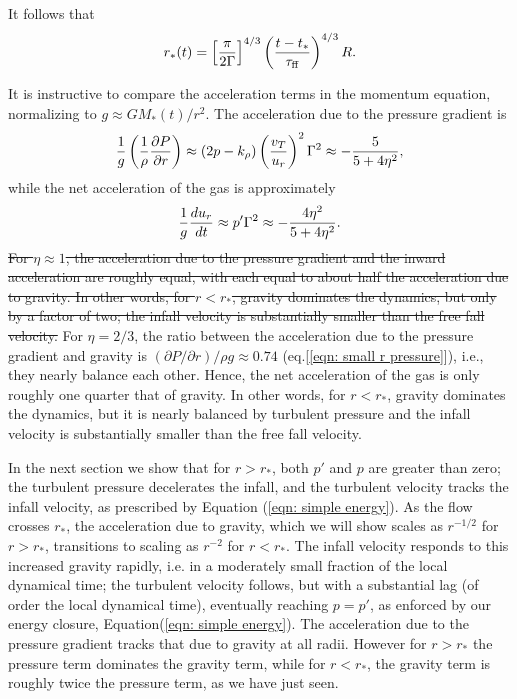 \documentclass[iop,apj,numberedappendix]{emulateapj}
\newcommand       \phil[1]      {{\color{blue} #1}}
\newcommand       \be		{\begin{equation}}
\newcommand       \ee		{\end{equation}}
\newcommand       \etaeff       {\eta}
\newcommand       \tff          {\tau_{\rm ff}}
\begin{document}
It follows that
%
\be \label{eqn: r_star}%
r_*(t)=\left[{\pi\over2\Gamma}\right]^{4/3}
\left({t-t_*\over\tff}\right)^{4/3}R.
\ee %
%

It is instructive to compare the acceleration terms in the momentum
equation, normalizing to $g\approx G M_*(t)/r^2$.  The acceleration
due to the pressure gradient is
%
\be  \label{eqn: small r pressure}%
{1\over g}\left({1\over\rho}{\partial P\over \partial r}\right)
\approx(2p-k_\rho)\left({v_T\over u_r}\right)^2\Gamma^2
\approx-{5\over 5+4\etaeff^2},
\ee  %
%
while the net acceleration of the gas is approximately
%
\be  %
{1\over g}{du_r\over dt}\approx p'\Gamma^2\approx-{4\etaeff^2\over 5+4\etaeff^2}.
\ee  %
%
\phil{\sout{
For $\etaeff\approx1$, the acceleration due to the pressure gradient
and the inward acceleration are roughly equal, with each equal to
about half the acceleration due to gravity. In other words, for
$r<r_*$, gravity dominates the dynamics, but only by a factor of two;
the infall velocity is substantially smaller than the free fall
velocity.
}
For $\etaeff = 2/3$, the ratio between the acceleration due to the pressure gradient and gravity is 
$(\partial P/\partial r)/\rho g \approx 0.74$ (eq.[\ref{eqn: small r pressure}]), i.e., they nearly balance each other.  
Hence, the net acceleration of the gas is only roughly one quarter that of gravity. In other words, for
$r<r_*$, gravity dominates the dynamics, but it is nearly balanced by turbulent pressure and 
the infall velocity is substantially smaller than the free fall
velocity.}

In the next section we show that for $r>r_*$, both $p'$ and $p$ are greater
than zero; the turbulent pressure decelerates the infall, and the
turbulent velocity tracks the infall velocity, as prescribed by
Equation (\ref{eqn: simple energy}). As the flow crosses $r_*$, the
acceleration due to gravity, which we will show scales as $r^{-1/2}$
for $r>r_*$, transitions to scaling as $r^{-2}$ for $r<r_*$.  The
infall velocity responds to this increased gravity rapidly, i.e. in a
moderately small fraction of the local dynamical time; the turbulent
velocity follows, but with a substantial lag (of order the local
dynamical time), eventually reaching $p=p'$, as enforced by our energy
closure, Equation(\ref{eqn: simple energy}). The acceleration due to the
pressure gradient tracks that due to gravity at all radii. However for
$r>r_*$ the pressure term dominates the gravity term, while for
$r<r_*$, the gravity term is roughly twice the pressure term, as we
have just seen.
\end{document}
